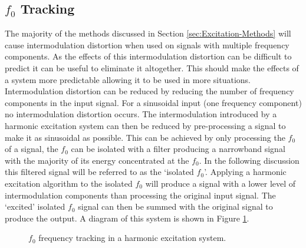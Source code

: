 	\subsection{$f_{0}$ Tracking}
	\label{sec:FeatureControl-Systems-Fundamental}
		The majority of the methods discussed in Section \ref{sec:Excitation-Methods} will cause intermodulation
		distortion when used on signals with multiple frequency components. As the effects of this intermodulation
		distortion can be difficult to predict it can be useful to eliminate it altogether. This should make the
		effects of a system more predictable allowing it to be used in more situations.	Intermodulation distortion
		can be reduced by reducing the number of frequency components in the input signal. For a sinusoidal input
		(one frequency component) no intermodulation distortion occurs. The intermodulation introduced by a
		harmonic excitation system can then be reduced by pre-processing a signal to make it as sinusoidal as
		possible. This can be achieved by only processing the $f_{0}$ of a signal, the $f_{0}$ can be isolated with
		a filter producing a narrowband signal with the majority of its energy concentrated at the $f_{0}$. In the
		following discussion this filtered signal will be referred to as the `isolated $f_{0}$'. Applying a
		harmonic excitation algorithm to the isolated $f_{0}$ will produce a signal with a lower level of
		intermodulation components than processing the original input signal. The `excited' isolated $f_{0}$ signal
		can then be summed with the original signal to produce the output. A diagram of this system is shown in
		Figure \ref{fig:F0Tracking}.

		\begin{figure}[h!]
			\centering
			\caption{$f_{0}$ frequency tracking in a harmonic excitation system.}
			\label{fig:F0Tracking}
		\end{figure}

